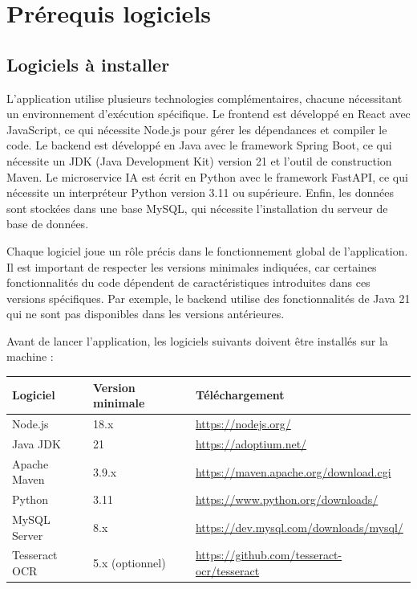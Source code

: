\documentclass[12pt,a4paper]{report}
\begin{document}
\chapter{Prérequis logiciels}

\section{Logiciels à installer}

L'application utilise plusieurs technologies complémentaires, chacune nécessitant un environnement d'exécution spécifique. Le frontend est développé en React avec JavaScript, ce qui nécessite Node.js pour gérer les dépendances et compiler le code. Le backend est développé en Java avec le framework Spring Boot, ce qui nécessite un JDK (Java Development Kit) version 21 et l'outil de construction Maven. Le microservice IA est écrit en Python avec le framework FastAPI, ce qui nécessite un interpréteur Python version 3.11 ou supérieure. Enfin, les données sont stockées dans une base MySQL, qui nécessite l'installation du serveur de base de données.

Chaque logiciel joue un rôle précis dans le fonctionnement global de l'application. Il est important de respecter les versions minimales indiquées, car certaines fonctionnalités du code dépendent de caractéristiques introduites dans ces versions spécifiques. Par exemple, le backend utilise des fonctionnalités de Java 21 qui ne sont pas disponibles dans les versions antérieures.

Avant de lancer l'application, les logiciels suivants doivent être installés sur la machine :

\begin{longtable}{|p{4cm}|p{4cm}|p{6cm}|}
\hline
\textbf{Logiciel} & \textbf{Version minimale} & \textbf{Téléchargement} \\
\hline
Node.js & 18.x & \url{https://nodejs.org/} \\
\hline
Java JDK & 21 & \url{https://adoptium.net/} \\
\hline
Apache Maven & 3.9.x & \url{https://maven.apache.org/download.cgi} \\
\hline
Python & 3.11 & \url{https://www.python.org/downloads/} \\
\hline
MySQL Server & 8.x & \url{https://dev.mysql.com/downloads/mysql/} \\
\hline
Tesseract OCR & 5.x (optionnel) & \url{https://github.com/tesseract-ocr/tesseract} \\
\hline
\end{longtable}
\end{document}
